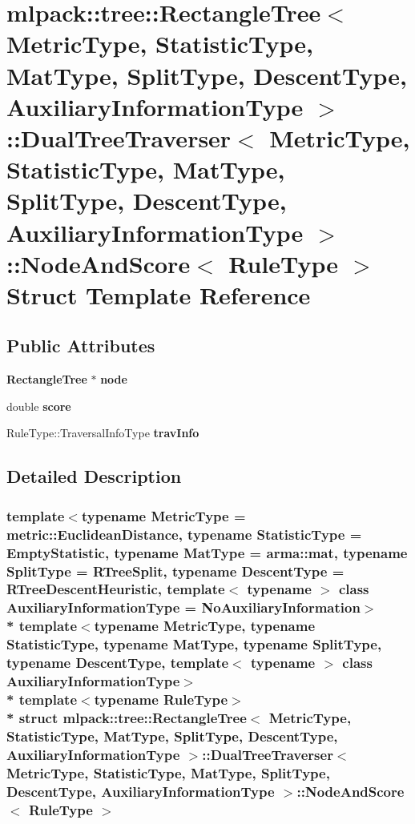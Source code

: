 \section{mlpack\+:\+:tree\+:\+:Rectangle\+Tree$<$ Metric\+Type, Statistic\+Type, Mat\+Type, Split\+Type, Descent\+Type, Auxiliary\+Information\+Type $>$\+:\+:Dual\+Tree\+Traverser$<$ Metric\+Type, Statistic\+Type, Mat\+Type, Split\+Type, Descent\+Type, Auxiliary\+Information\+Type $>$\+:\+:Node\+And\+Score$<$ Rule\+Type $>$ Struct Template Reference}
\label{structmlpack_1_1tree_1_1RectangleTree_1_1DualTreeTraverser_1_1NodeAndScore}
\subsection*{Public Attributes}
\begin{DoxyCompactItemize}
\item 
{\bf Rectangle\+Tree} $\ast$ {\bf node}
\item 
double {\bf score}
\item 
Rule\+Type\+::\+Traversal\+Info\+Type {\bf trav\+Info}
\end{DoxyCompactItemize}


\subsection{Detailed Description}
\subsubsection*{template$<$typename Metric\+Type = metric\+::\+Euclidean\+Distance, typename Statistic\+Type = Empty\+Statistic, typename Mat\+Type = arma\+::mat, typename Split\+Type = R\+Tree\+Split, typename Descent\+Type = R\+Tree\+Descent\+Heuristic, template$<$ typename $>$ class Auxiliary\+Information\+Type = No\+Auxiliary\+Information$>$\\*
template$<$typename Metric\+Type, typename Statistic\+Type, typename Mat\+Type, typename Split\+Type, typename Descent\+Type, template$<$ typename $>$ class Auxiliary\+Information\+Type$>$\\*
template$<$typename Rule\+Type$>$\\*
struct mlpack\+::tree\+::\+Rectangle\+Tree$<$ Metric\+Type, Statistic\+Type, Mat\+Type, Split\+Type, Descent\+Type, Auxiliary\+Information\+Type $>$\+::\+Dual\+Tree\+Traverser$<$ Metric\+Type, Statistic\+Type, Mat\+Type, Split\+Type, Descent\+Type, Auxiliary\+Information\+Type $>$\+::\+Node\+And\+Score$<$ Rule\+Type $>$}



